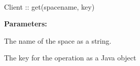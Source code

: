 %
%
%


\paragraph{}
\label{api:java:get}
\begin{javacode}
Client :: get(spacename, key)
\end{javacode}
\funcdesc 

\noindent\textbf{Parameters:}
\begin{description}[labelindent=\widthof{{\code{spacename}}},leftmargin=*,noitemsep,nolistsep,align=right]
\item[\code{spacename}] The name of the space as a string.
\item[\code{key}] The key for the operation as a Java object
\end{description}

